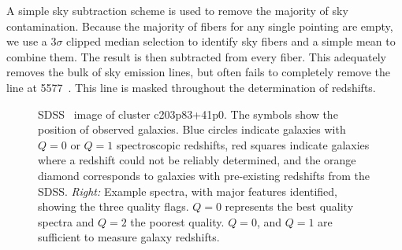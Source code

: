 A simple sky subtraction scheme is used to remove the majority of sky contamination. Because the majority of fibers for any single pointing are empty, we use a $3\sigma$ clipped median selection to identify sky fibers and a simple mean to combine them. The result is then subtracted from every fiber. This adequately removes the bulk of sky emission lines, but often fails to completely remove the \hbox{} line at 5577~\AAA. This line is masked throughout the determination of redshifts.

\begin{figure}[t]
\hfill
{}
    \caption[SDSS \sdssr\ image of cluster c203p83+41p0 and spectra quality examples]{SDSS \sdssr\ image of cluster c203p83+41p0. The symbols show the position of observed galaxies. Blue circles indicate galaxies with $Q=0$ or $Q=1$ spectroscopic redshifts, red squares indicate galaxies where a redshift could not be reliably determined, and the orange diamond corresponds to galaxies with pre-existing redshifts from the SDSS. \textit{Right:} Example spectra, with major features identified, showing the three quality flags. $Q=0$ represents the best quality spectra and $Q=2$ the poorest quality. $Q=0$, and $Q=1$ are sufficient to measure galaxy redshifts.} 
	\label{2fig:c203p83+41p0}
\end{figure}

